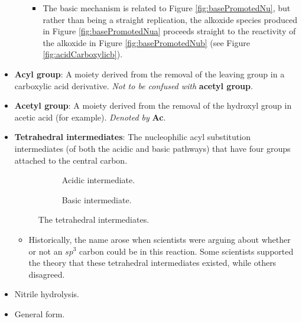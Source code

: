 \documentclass[../notes.tex]{subfiles}
\begin{document}
\begin{itemize}
\begin{itemize}
\begin{itemize}
            \item The basic mechanism is related to Figure \ref{fig:basePromotedNu}, but rather than being a straight replication, the alkoxide species produced in Figure \ref{fig:basePromotedNua} proceeds straight to the reactivity of the alkoxide in Figure \ref{fig:basePromotedNub} (see Figure \ref{fig:acidCarboxylicb}).
        \end{itemize}
    \end{itemize}
    \item \textbf{Acyl group}: A moiety derived from the removal of the leaving group in a carboxylic acid derivative. \emph{Not to be confused with} \textbf{acetyl group}.
    \item \textbf{Acetyl group}: A moiety derived from the removal of the hydroxyl group in acetic acid (for example). \emph{Denoted by} \textbf{Ac}.
    \item \textbf{Tetrahedral intermediates}: The nucleophilic acyl substitution intermediates (of both the acidic and basic pathways) that have four groups attached to the central carbon.
    \begin{figure}[h!]
        \centering
        \footnotesize
        \begin{subfigure}[b]{0.3\linewidth}
            \centering
            \caption{Acidic intermediate.}
            \label{fig:tetrahedralIntermediatesa}
        \end{subfigure}
        \begin{subfigure}[b]{0.3\linewidth}
            \centering
            \caption{Basic intermediate.}
            \label{fig:tetrahedralIntermediatesb}
        \end{subfigure}
        \caption{The tetrahedral intermediates.}
        \label{fig:tetrahedralIntermediates}
    \end{figure}
    \begin{itemize}
        \item Historically, the name arose when scientists were arguing about whether or not an $sp^3$ carbon could be in this reaction. Some scientists supported the theory that these tetrahedral intermediates existed, while others disagreed.
    \end{itemize}
    \item Nitrile hydrolysis.
    \item General form.
    \begin{equation*}

\end{equation*}
\end{itemize}
\end{document}
